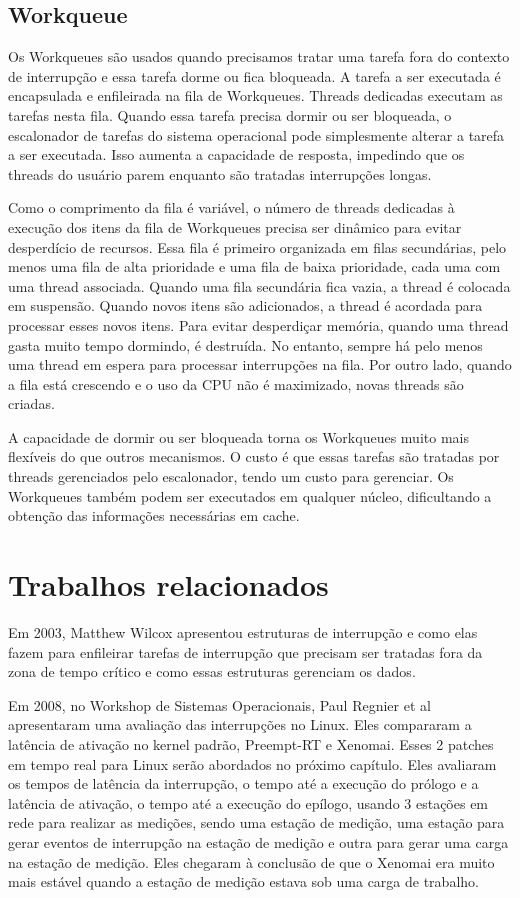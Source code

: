 \subsection{Workqueue}

Os Workqueues são usados quando precisamos tratar uma tarefa fora do contexto de interrupção e essa tarefa dorme ou fica bloqueada. A tarefa a ser executada é encapsulada e enfileirada na fila de Workqueues. Threads dedicadas executam as tarefas nesta fila. Quando essa tarefa precisa dormir ou ser bloqueada, o escalonador de tarefas do sistema operacional pode simplesmente alterar a tarefa a ser executada. Isso aumenta a capacidade de resposta, impedindo que os threads do usuário parem enquanto são tratadas interrupções longas.

Como o comprimento da fila é variável, o número de threads dedicadas à execução dos itens da fila de Workqueues precisa ser dinâmico para evitar desperdício de recursos. Essa fila é primeiro organizada em filas secundárias, pelo menos uma fila de alta prioridade e uma fila de baixa prioridade, cada uma com uma thread associada. Quando uma fila secundária fica vazia, a thread é colocada em suspensão. Quando novos itens são adicionados, a thread é acordada para processar esses novos itens. Para evitar desperdiçar memória, quando uma thread gasta muito tempo dormindo, é destruída. No entanto, sempre há pelo menos uma thread em espera para processar interrupções na fila. Por outro lado, quando a fila está crescendo e o uso da CPU não é maximizado, novas threads são criadas.

A capacidade de dormir ou ser bloqueada torna os Workqueues muito mais flexíveis do que outros mecanismos. O custo é que essas tarefas são tratadas por threads gerenciados pelo escalonador, tendo um custo para gerenciar. Os Workqueues também podem ser executados em qualquer núcleo, dificultando a obtenção das informações necessárias em cache. \cite{OReilly, Rothberg2015}

\section{Trabalhos relacionados}

Em 2003, Matthew Wilcox \cite{Wilcox2003} apresentou estruturas de interrupção e como elas fazem para enfileirar tarefas de interrupção que precisam ser tratadas fora da zona de tempo crítico e como essas estruturas gerenciam os dados.

Em 2008, no Workshop de Sistemas Operacionais, Paul Regnier et al \cite{Regnier2008} apresentaram uma avaliação das interrupções no Linux. Eles compararam a latência de ativação no kernel padrão, Preempt-RT e Xenomai. Esses 2 patches em tempo real para Linux serão abordados no próximo capítulo. Eles avaliaram os tempos de latência da interrupção, o tempo até a execução do prólogo e a latência de ativação, o tempo até a execução do epílogo, usando 3 estações em rede para realizar as medições, sendo uma estação de medição, uma estação para gerar eventos de interrupção na estação de medição e outra para gerar uma carga na estação de medição. Eles chegaram à conclusão de que o Xenomai era muito mais estável quando a estação de medição estava sob uma carga de trabalho.

